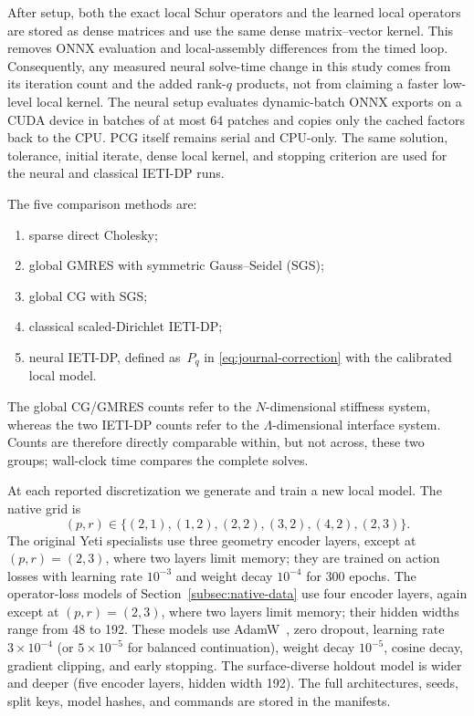 \documentclass{article}
\theoremstyle{plain}
\numberwithin{equation}{section}
\begin{document}
After setup, both the exact local Schur operators and the learned local
operators are stored as dense matrices and use the same dense matrix--vector
kernel.  This removes ONNX evaluation and local-assembly differences from the
timed loop.  Consequently, any measured neural solve-time change in this study
comes from its iteration count and the added rank-$q$ products, not from
claiming a faster low-level local kernel.
The neural setup evaluates dynamic-batch ONNX exports on a CUDA device in
batches of at most 64 patches and copies only the cached factors back to the
CPU.  PCG itself remains serial and CPU-only.  The same solution, tolerance,
initial iterate, dense local kernel, and stopping criterion are used for the
neural and classical IETI-DP runs.

The five comparison methods are:
\begin{enumerate}
    \item sparse direct Cholesky;
    \item global GMRES with symmetric Gauss--Seidel (SGS);
    \item global CG with SGS;
    \item classical scaled-Dirichlet IETI-DP;
    \item neural IETI-DP, defined as~$P_q$ in
          \eqref{eq:journal-correction} with the calibrated local model.
\end{enumerate}
The global CG/GMRES counts refer to the $N$-dimensional stiffness system,
whereas the two IETI-DP counts refer to the $\Lambda$-dimensional interface
system.  Counts are therefore directly comparable within, but not across,
these two groups; wall-clock time compares the complete solves.

At each reported discretization we generate and train a new local model.  The
native grid is
\begin{equation}
    (p,r)\in\{(2,1),(1,2),(2,2),(3,2),(4,2),(2,3)\}.
    \label{eq:journal-pr-grid}
\end{equation}
The original Yeti specialists use three geometry encoder layers, except at
$(p,r)=(2,3)$, where two layers limit memory; they are trained on action losses
with learning rate $10^{-3}$ and weight decay $10^{-4}$ for 300 epochs.  The
operator-loss models of Section~\ref{subsec:native-data}
use four encoder layers, again except at $(p,r)=(2,3)$, where two layers limit
memory; their hidden widths range from 48 to 192.  These models use
AdamW~\cite{loshchilov2019decoupledweightdecayregularization}, zero dropout,
learning rate $3\times10^{-4}$ (or $5\times10^{-5}$ for balanced
continuation), weight decay $10^{-5}$, cosine decay, gradient clipping, and
early stopping.  The surface-diverse holdout model is wider and deeper
(five encoder layers, hidden width 192).  The full architectures, seeds, split keys, model hashes, and
commands are stored in the manifests.
\end{document}
